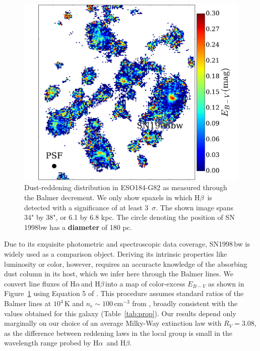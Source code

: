\documentclass[traditabstract]{aa}
\newcommand{\hb}{H$\beta$}
\newcommand{\ha}{H$\alpha$}
\begin{document}
\begin{figure}
\includegraphics[angle=0, width=0.99\columnwidth]{Figs/MUSE_SN1998bw_EB-V.pdf}
\caption{Dust-reddening distribution in ESO184-G82 as measured through the Balmer decrement. We only show spaxels in which \hb\, is detected with a significance of at least 3~$\sigma$. The shown image spans 34" by 38", or 6.1 by 6.8 kpc. The circle denoting the position of SN\,1998bw has a \textbf{diameter} of 180 pc.}
\label{fig:ebv}
\end{figure}

Due to its exquisite photometric and spectroscopic data coverage, SN1998\,bw is widely used as a comparison object. Deriving its intrinsic properties like luminosity or color, however, requires an accuracte knowledge of the absorbing dust column in its host, which we infer here through the Balmer lines. We convert line fluxes of \ha\,and \hb\,into a map of color-excess $E_{B-V}$ as shown in Figure~\ref{fig:ebv} using Equation 5 of \citet{2015A&A...581A.125K}. This procedure assumes standard ratios of the Balmer lines at $10^4$\,K and $n_e\sim100\,\mathrm{cm}^{-3}$ from \citet{1989agna.book.....O}, broadly consistent with the values obtained for this galaxy (Table~\ref{tab:prop}). Our results depend only marginally on our choice of an average Milky-Way extinction law \citep{1992ApJ...395..130P} with $R_V=3.08$, as the difference between reddening laws in the local group is small in the wavelength range probed by \ha\, and \hb. 
\end{document}
